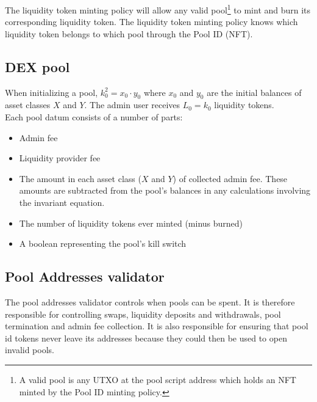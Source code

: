 \documentclass{article}
\begin{document}
The liquidity token minting policy will allow any valid pool\footnote{
  A valid pool is any UTXO at the pool script address which holds an NFT minted
  by the Pool ID minting policy.
} to mint and burn its corresponding liquidity token. The liquidity token
minting policy knows which liquidity token belongs to which pool through the
Pool ID (NFT).

\subsection{DEX pool}

When initializing a pool, $k_0^2 = x_0 \cdot y_0$ where $x_0$ and $y_0$ are the
initial balances of asset classes $X$ and $Y$. The admin user receives $L_0 =
k_0$ liquidity tokens. \\

Each pool datum consists of a number of parts:
\begin{itemize}
  \item Admin fee
  \item Liquidity provider fee
  \item The amount in each asset class ($X$ and $Y$) of collected admin fee.
    These amounts are subtracted from the pool's balances in any calculations
    involving the invariant equation.
  \item The number of liquidity tokens ever minted (minus burned)
  \item A boolean representing the pool's kill switch
\end{itemize}


\subsection{Pool Addresses validator}

The pool addresses validator controls when pools can be spent.
It is therefore responsible for controlling swaps,
liquidity deposits and withdrawals, pool termination
and admin fee collection.
It is also responsible for ensuring that
pool id tokens never leave its addresses
because they could then be used to open invalid pools.
\end{document}
